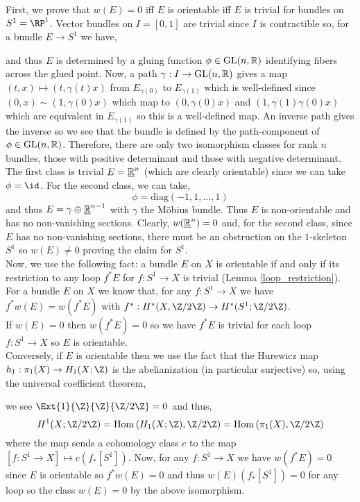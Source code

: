 \documentclass[12pt]{extarticle}
\begin{document}
First, we prove that $w(E) = 0$ iff $E$ is orientable iff $E$ is trivial for bundles on $S^1 = \RP^1$. Vector bundles on $I = [0, 1]$ are trivial since $I$ is contractible so, for a bundle $E \to S^1$ we have,
\begin{center}
\end{center} 
and thus $E$ is determined by a gluing function $\phi \in \mathrm{GL}(n, \mathbb{R})$ identifying fibers across the glued point. Now, a path $\gamma : I \to \mathrm{GL}(n, \mathbb{R})$ gives a map $(t, x) \mapsto (t, \gamma(t)x)$ from $E_{\gamma(0)}$ to $E_{\gamma(1)}$ which is well-defined since $(0, x) \sim (1, \gamma(0) x)$ which map to $(0, \gamma(0) x)$ and $(1, \gamma(1) \gamma(0) x)$ which are equivalent in $E_{\gamma(1)}$ so this is a well-defined map. An inverse path gives the inverse so we see that the bundle is defined by the path-component of $\phi \in \mathrm{GL}(n, \mathbb{R})$. Therefore, there are only two isomorphism classes for rank $n$ bundles, those with positive determinant and those with negative determinant. The first class is trivial $E = \underline{\mathbb{R}}^n$ (which are clearly orientable) since we can take $\phi = \id$. For the second class, we can take,
\[ \phi = \mathrm{diag}(-1, 1, \dots, 1) \]
and thus $E = \gamma \oplus \underline{\mathbb{R}}^{n-1}$ with $\gamma$ the M\"{o}bius bundle. Thus $E$ is non-orientable and has no non-vanishing sections. Clearly, $w(\underline{\mathbb{R}}^n) = 0$ and, for the second class, since $E$ has no non-vanishing sections, there must be an obstruction on the $1$-skeleton $S^1$ so $w(E) \neq 0$ proving the claim for $S^1$. 
\bigskip\\
Now, we use the following fact: a bundle $E$ on $X$ is orientable if and only if its restriction to any loop $f^* E$ for $f : S^1 \to X$ is trivial (Lemma \ref{loop_restriction}). For a bundle $E$ on $X$ we know that, for any $f : S^1 \to X$ we have $f^* w(E) = w(f^* E)$ with $f^* : H^*(X, \Z / 2 \Z) \to H^*(S^1; \Z / 2 \Z)$.
\bigskip\\
If $w(E) = 0$ then $w(f^* E) = 0$ so we have $f^* E$ is trivial for each loop $f : S^1 \to X$ so $E$ is orientable.
\bigskip\\
Conversely, if $E$ is orientable then we use the fact that the Hurewicz map $h_1 : \pi_1(X) \to H_1(X; \Z)$ is the abelianization (in particular surjective) so, using the universal coefficient theorem,
\begin{center}
\end{center}
we see $\Ext{1}{\Z}{\Z}{\Z/2\Z} = 0$ and thus,
\[ H^1(X; \Z / 2 \Z) = \Hom{H_1(X; \Z)}{\Z / 2 \Z} = \Hom{\pi_1(X)}{\Z / 2 \Z} \]
where the map sends a cohomology class $c$ to the map $[f : S^1 \to X] \mapsto c(f_*[S^1])$. 
Now, for any $f : S^1 \to X$ we have $w(f^* E) = 0$ since $E$ is orientable so $f^* w(E) = 0$ and thus $w(E)(f_*[S^1]) = 0$ for any loop so the class $w(E) = 0$ by the above isomorphism. 
\end{document}
